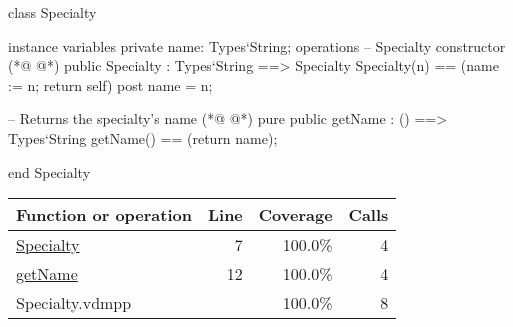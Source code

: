 \begin{vdmpp}[breaklines=true]
class Specialty

instance variables
  private name: Types`String;
operations
 -- Specialty constructor
(*@
\label{Specialty:7}
@*)
 public Specialty : Types`String ==> Specialty
  Specialty(n) == (name := n; return self)
 post name = n;
 
 -- Returns the specialty's name
(*@
\label{getName:12}
@*)
 pure public getName : () ==> Types`String
  getName() == (return name);

end Specialty
\end{vdmpp}
\bigskip
\begin{longtable}{|l|r|r|r|}
\hline
Function or operation & Line & Coverage & Calls \\
\hline
\hline
\hyperref[Specialty:7]{Specialty} & 7&100.0\% & 4 \\
\hline
\hyperref[getName:12]{getName} & 12&100.0\% & 4 \\
\hline
\hline
Specialty.vdmpp & & 100.0\% & 8 \\
\hline
\end{longtable}


